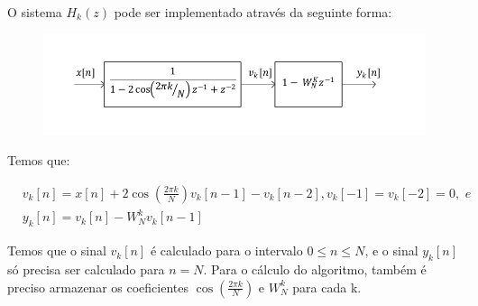 \documentclass[monografia]{subfiles}
\begin{document}

		O sistema $H_k(z)$ pode ser implementado através da seguinte forma:

		\begin{figure}[!h]
		\centering 
			\includegraphics[scale=1.1]{img/HK_systemBlock.pdf}
		\label{fig:systemHKBlock}
		\end{figure}

		Temos que:

			\begin{align}
			& v_k[n] = x[n] + 2 \cos(\frac{2 \pi k}{N}) v_k[n-1] - v_k[n-2], v_k[-1] = v_k[-2] = 0 , \textit{ e}\\  
			& y_k[n] = v_k[n] - W_N^{k} v_k[n-1]										
		\end{align}

		Temos que o sinal $v_k[n]$ é calculado para o intervalo $0 \le n \le N$, e o sinal $y_k[n]$ só precisa ser calculado para $n=N$. Para 
		o cálculo do algoritmo, também é preciso armazenar os coeficientes $\cos(\frac{2 \pi k}{N})$ e $W_N^{k}$ para cada k.	
\end{document}
